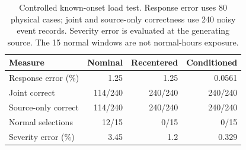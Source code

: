 \begin{table}[t]\centering\footnotesize\setlength{\tabcolsep}{3pt}
\caption{Controlled known-onset load test. Response error uses 80 physical cases; joint and source-only correctness use 240 noisy event records. Severity error is evaluated at the generating source. The 15 normal windows are not normal-hours exposure.}
\label{tab:ei-results}
\begin{tabular}{lrrr}\toprule
Measure & Nominal & Recentered & Conditioned\\\midrule
Response error (\%) & 1.25 & 1.25 & 0.0561\\
Joint correct & 114/240 & 240/240 & 240/240\\
Source-only correct & 114/240 & 240/240 & 240/240\\
Normal selections & 12/15 & 0/15 & 0/15\\
Severity error (\%) & 3.45 & 1.2 & 0.329\\
\bottomrule\end{tabular}\end{table}
